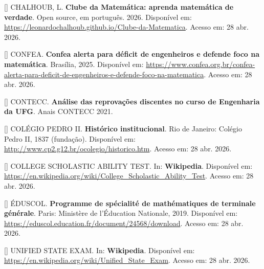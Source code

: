 \documentclass[12pt,a4paper,oneside]{article}
\begin{document}
\begin{singlespace}
\noindent\hangindent=1.25cm
[\theequation\label{ref:clube-matematica}]
CHALHOUB, L. \textbf{Clube da Matemática: aprenda matemática de
verdade}. Open source, em português. 2026. Disponível em:
\url{https://leonardochalhoub.github.io/Clube-da-Matematica}.
Acesso em: 28 abr. 2026.\par\smallskip

\noindent\hangindent=1.25cm
[\theequation\label{ref:confea-deficit}]
CONFEA. \textbf{Confea alerta para déficit de engenheiros e defende
foco na matemática}. Brasília, 2025. Disponível em:
\url{https://www.confea.org.br/confea-alerta-para-deficit-de-engenheiros-e-defende-foco-na-matematica}.
Acesso em: 28 abr. 2026.\par\smallskip

\noindent\hangindent=1.25cm
[\theequation\label{ref:contecc-ufg}]
CONTECC. \textbf{Análise das reprovações discentes no curso de
Engenharia da UFG}. Anais CONTECC 2021.\par\smallskip

\noindent\hangindent=1.25cm
[\theequation\label{ref:cp2-historico}]
COLÉGIO PEDRO II. \textbf{Histórico institucional}. Rio de Janeiro:
Colégio Pedro II, 1837 (fundação). Disponível em:
\url{http://www.cp2.g12.br/ocolegio/historico.htm}. Acesso em: 28
abr. 2026.\par\smallskip

\noindent\hangindent=1.25cm
[\theequation\label{ref:csat-wiki}]
COLLEGE SCHOLASTIC ABILITY TEST. In: \textbf{Wikipedia}.
Disponível em:
\url{https://en.wikipedia.org/wiki/College_Scholastic_Ability_Test}.
Acesso em: 28 abr. 2026.\par\smallskip

\noindent\hangindent=1.25cm
[\theequation\label{ref:eduscol-spe-maths}]
ÉDUSCOL. \textbf{Programme de spécialité de mathématiques de
terminale générale}. Paris: Ministère de l'Éducation Nationale,
2019. Disponível em:
\url{https://eduscol.education.fr/document/24568/download}. Acesso
em: 28 abr. 2026.\par\smallskip

\noindent\hangindent=1.25cm
[\theequation\label{ref:ege-wiki}]
UNIFIED STATE EXAM. In: \textbf{Wikipedia}. Disponível em:
\url{https://en.wikipedia.org/wiki/Unified_State_Exam}. Acesso em:
28 abr. 2026.\par\smallskip


\end{singlespace}
\end{document}
